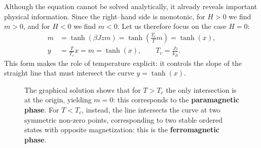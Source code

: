 Although the equation cannot be solved analytically, it already reveals important physical information. Since the right–hand side is monotonic, for \(H>0\) we find \(m>0\), and for \(H<0\) we find \(m<0\). Let us therefore focus on the case \(H=0\):
\[
    \begin{aligned}
        m & = \tanh(\beta J z m) = \tanh\!\left(\frac{T_c}{T} m\right) = \tanh(x), \\
        y & = \frac{T}{T_c} x = m = \tanh(x), \qquad T_c = \frac{J z}{k_B}.
    \end{aligned}
\]
This form makes the role of temperature explicit: it controls the slope of the straight line that must intersect the curve \(y=\tanh(x)\).
\begin{figure}[H]
    \begin{minipage}{0.6\textwidth}
        \centering
    \end{minipage}
    \hfill
    \begin{minipage}{0.35\textwidth}
        The graphical solution shows that for \(T > T_c\) the only intersection is at the origin, yielding \(m=0\): this corresponds to the \textbf{paramagnetic phase}. For \(T < T_c\), instead, the line intersects the curve at two symmetric non-zero points, corresponding to two stable ordered states with opposite magnetization: this is the \textbf{ferromagnetic phase}.
    \end{minipage}
\end{figure}

